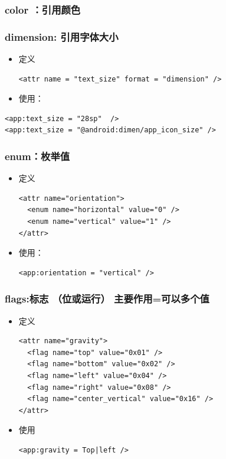 \documentclass[9pt, b5paper]{article}
\begin{document}
\subsubsection{color ：引用颜色}
\label{sec-1-2-1}
\subsubsection{dimension: 引用字体大小}
\label{sec-1-2-2}
\begin{itemize}
\item 定义
\begin{verbatim}
<attr name = "text_size" format = "dimension" />
\end{verbatim}
\item 使用：
\end{itemize}
\begin{verbatim}
<app:text_size = "28sp"  />
<app:text_size = "@android:dimen/app_icon_size" />
\end{verbatim}
\subsubsection{enum：枚举值}
\label{sec-1-2-3}
\begin{itemize}
\item 定义
\begin{verbatim}
<attr name="orientation">
  <enum name="horizontal" value="0" />
  <enum name="vertical" value="1" />
</attr>
\end{verbatim}
\item 使用：
\begin{verbatim}
<app:orientation = "vertical" />
\end{verbatim}
\end{itemize}
\subsubsection{flags:标志 （位或运行） 主要作用=可以多个值}
\label{sec-1-2-4}
\begin{itemize}
\item 定义
\begin{verbatim}
<attr name="gravity">
  <flag name="top" value="0x01" />
  <flag name="bottom" value="0x02" />
  <flag name="left" value="0x04" />
  <flag name="right" value="0x08" />
  <flag name="center_vertical" value="0x16" />
</attr>
\end{verbatim}
\item 使用
\begin{verbatim}
<app:gravity = Top|left />
\end{verbatim}
\end{itemize}
\end{document}
